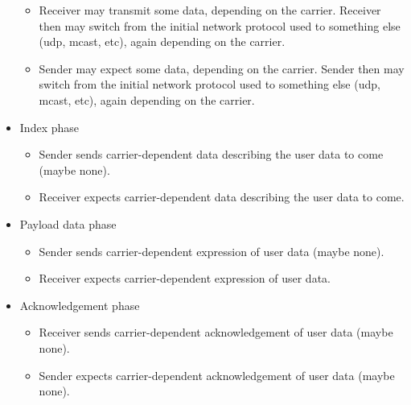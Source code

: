 \documentclass[a4]{article}
\begin{document}
\begin{itemize}
\begin{itemize}
  \item Receiver may transmit some data, depending on the carrier.
    Receiver then may switch from the initial network
    protocol used to something else (udp, mcast, etc), again
    depending on the carrier.
    
  \item Sender may expect some data, depending on the carrier.
    Sender then may switch from the initial network
    protocol used to something else (udp, mcast, etc), again
    depending on the carrier.

  \end{itemize}

\item Index phase
    
  \begin{itemize}
    
  \item Sender sends carrier-dependent data describing the user data to come (maybe none).
    
  \item Receiver expects carrier-dependent data describing the user data to come.
    
  \end{itemize}
  
\item Payload data phase
  
  \begin{itemize}
    
  \item Sender sends carrier-dependent expression of user data (maybe none).
    
  \item Receiver expects carrier-dependent expression of user data.
    
  \end{itemize}

\item Acknowledgement phase

  \begin{itemize}
    
  \item Receiver sends carrier-dependent acknowledgement of user data (maybe none).
    
  \item Sender expects carrier-dependent acknowledgement of user data (maybe none).
    
  \end{itemize}

  
\end{itemize}
\end{document}
